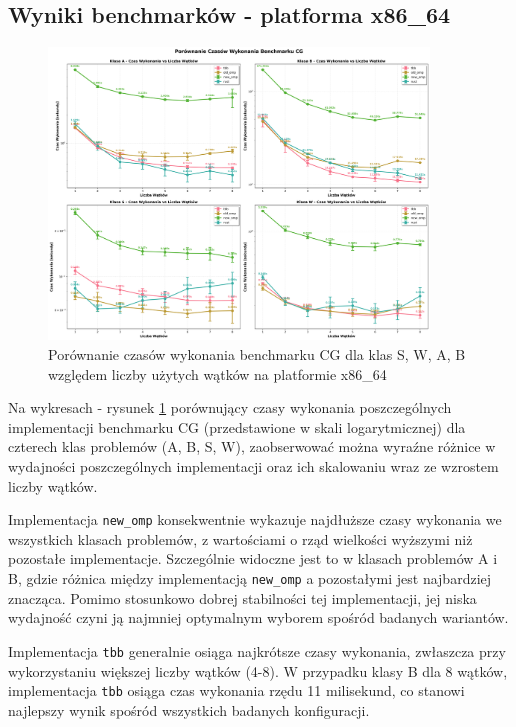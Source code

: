 \subsection{Wyniki benchmarków - platforma x86\_64}
\begin{figure}[!h]
    \centering
    \includegraphics[width=0.9\textwidth]{analiza/images/parallel/cg/x86/cg_porownanie_czasow_wykonania.png}
    \caption{Porównanie czasów wykonania benchmarku CG dla klas S, W, A, B względem liczby użytych wątków na platformie x86\_64}
    \label{cg_porownanie_czasow_wykonania_x86_64}
\end{figure}
Na wykresach - rysunek \ref{cg_porownanie_czasow_wykonania_x86_64} porównujący czasy wykonania poszczególnych implementacji benchmarku CG (przedstawione w skali logarytmicznej) dla czterech klas problemów (A, B, S, W), zaobserwować można wyraźne różnice w wydajności poszczególnych implementacji oraz ich skalowaniu wraz ze wzrostem liczby wątków.

Implementacja \texttt{new\_omp} konsekwentnie wykazuje najdłuższe czasy wykonania we wszystkich klasach problemów, z wartościami o rząd wielkości wyższymi niż pozostałe implementacje. Szczególnie widoczne jest to w klasach problemów A i B, gdzie różnica między implementacją \texttt{new\_omp} a pozostałymi jest najbardziej znacząca. Pomimo stosunkowo dobrej stabilności tej implementacji, jej niska wydajność czyni ją najmniej optymalnym wyborem spośród badanych wariantów.

Implementacja \texttt{tbb} generalnie osiąga najkrótsze czasy wykonania, zwłaszcza przy wykorzystaniu większej liczby wątków (4-8). W przypadku klasy B dla 8 wątków, implementacja \texttt{tbb} osiąga czas wykonania rzędu 11 milisekund, co stanowi najlepszy wynik spośród wszystkich badanych konfiguracji.

